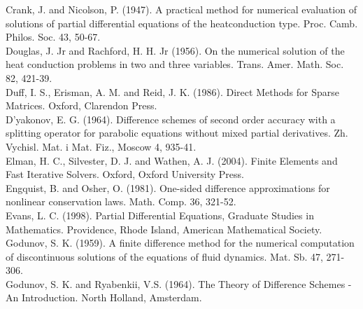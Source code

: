 \documentclass[10pt]{article}
\begin{document}
Crank, J. and Nicolson, P. (1947). A practical method for numerical evaluation of solutions of partial differential equations of the heatconduction type. Proc. Camb. Philos. Soc. 43, 50-67.\\
Douglas, J. Jr and Rachford, H. H. Jr (1956). On the numerical solution of the heat conduction problems in two and three variables. Trans. Amer. Math. Soc. 82, 421-39.\\
Duff, I. S., Erisman, A. M. and Reid, J. K. (1986). Direct Methods for Sparse Matrices. Oxford, Clarendon Press.\\
D'yakonov, E. G. (1964). Difference schemes of second order accuracy with a splitting operator for parabolic equations without mixed partial derivatives. Zh. Vychisl. Mat. i Mat. Fiz., Moscow 4, 935-41.\\
Elman, H. C., Silvester, D. J. and Wathen, A. J. (2004). Finite Elements and Fast Iterative Solvers. Oxford, Oxford University Press.\\
Engquist, B. and Osher, O. (1981). One-sided difference approximations for nonlinear conservation laws. Math. Comp. 36, 321-52.\\
Evans, L. C. (1998). Partial Differential Equations, Graduate Studies in Mathematics. Providence, Rhode Island, American Mathematical Society.\\
Godunov, S. K. (1959). A finite difference method for the numerical computation of discontinuous solutions of the equations of fluid dynamics. Mat. Sb. 47, 271-306.\\
Godunov, S. K. and Ryabenkii, V.S. (1964). The Theory of Difference Schemes - An Introduction. North Holland, Amsterdam.
\end{document}
